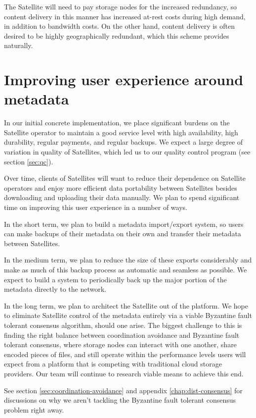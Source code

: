 \documentclass[8pt,fleqn,openany]{book}
\begin{document}
The Satellite will need to pay storage nodes for the increased redundancy, so
content delivery in this manner has increased at-rest costs during high
demand, in addition to bandwidth costs. On the other hand, content delivery is often
desired to be highly geographically redundant, which this scheme provides
naturally.

\section{Improving user experience around metadata}\label{sec:distributed-metadata}

In our initial concrete implementation, we place significant burdens on the
Satellite operator to maintain a good service level with high availability,
high durability, regular payments, and regular backups. We expect a large
degree of variation in quality of Satellites, which led us to our quality
control program (see section \ref{sec:qc}).

Over time, clients of Satellites will want to reduce their dependence on Satellite
operators and enjoy more efficient data portability between Satellites besides
downloading and uploading their data manually. We plan to spend significant time
on improving this user experience in a number of ways.

In the short term, we plan to build a metadata import/export system, so users
can make backups of their metadata on their own and transfer their metadata
between Satellites.

In the medium term, we plan to reduce the size of these exports considerably
and make as much of this backup process as automatic and seamless as possible.
We expect to build a system to periodically back up the major portion of the metadata
directly to the network.

In the long term, we plan to architect the Satellite out of the platform.
We hope to eliminate Satellite control of the metadata
entirely via a viable Byzantine fault tolerant consensus algorithm, should
one arise.
The biggest challenge to this is finding the right balance between coordination
avoidance and Byzantine fault tolerant consensus, where storage nodes can
interact with one another, share encoded pieces of files, and still operate
within the performance levels users will expect from a platform that is
competing with traditional cloud storage providers.
Our team will continue to research viable means to achieve this end.

See section \ref{sec:coordination-avoidance} and
appendix \ref{chap:dist-consensus} for discussions on why we aren't tackling
the Byzantine fault tolerant consensus problem right away.
\end{document}
